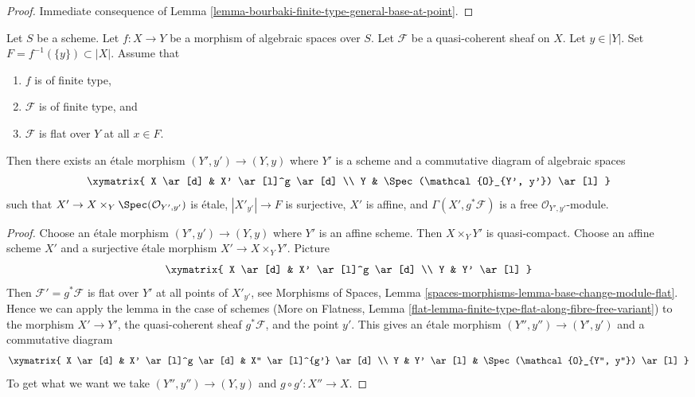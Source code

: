 \begin{proof}
Immediate consequence of
Lemma \ref{lemma-bourbaki-finite-type-general-base-at-point}.
\end{proof}

\begin{lemma}
\label{lemma-finite-type-flat-along-fibre-free-variant}
Let $S$ be a scheme. Let $f : X \to Y$ be a morphism of algebraic spaces
over $S$. Let $\mathcal{F}$ be a quasi-coherent sheaf on $X$.
Let $y \in |Y|$. Set $F = f^{-1}(\{y\}) \subset |X|$. Assume that
\begin{enumerate}
\item $f$ is of finite type,
\item $\mathcal{F}$ is of finite type, and
\item $\mathcal{F}$ is flat over $Y$ at all $x \in F$.
\end{enumerate}
Then there exists an \'etale morphism $(Y', y') \to (Y, y)$
where $Y'$ is a scheme and a commutative diagram of algebraic spaces
$$
\xymatrix{
X \ar[d] & X' \ar[l]^g \ar[d] \\
Y & \Spec(\mathcal{O}_{Y', y'}) \ar[l]
}
$$
such that $X' \to X \times_Y \Spec(\mathcal{O}_{Y', y'})$
is \'etale, $|X'_{y'}| \to F$ is surjective, $X'$ is affine,
and $\Gamma(X', g^*\mathcal{F})$ is a free $\mathcal{O}_{Y', y'}$-module.
\end{lemma}

\begin{proof}
Choose an \'etale morphism $(Y', y') \to (Y, y)$ where $Y'$ is an
affine scheme. Then $X \times_Y Y'$ is quasi-compact.
Choose an affine scheme $X'$ and a surjective \'etale morphism
$X' \to X \times_Y Y'$. Picture
$$
\xymatrix{
X \ar[d] & X' \ar[l]^g \ar[d] \\
Y & Y' \ar[l]
}
$$
Then $\mathcal{F}' = g^*\mathcal{F}$ is flat over $Y'$ at all
points of $X'_{y'}$, see Morphisms of Spaces, Lemma
\ref{spaces-morphisms-lemma-base-change-module-flat}.
Hence we can apply the lemma in the case of schemes
(More on Flatness, Lemma
\ref{flat-lemma-finite-type-flat-along-fibre-free-variant})
to the morphism
$X' \to Y'$, the quasi-coherent sheaf $g^*\mathcal{F}$, and the point $y'$.
This gives an \'etale morphism $(Y'', y'') \to (Y', y')$ and a commutative
diagram
$$
\xymatrix{
X \ar[d] & X' \ar[l]^g \ar[d] & X'' \ar[l]^{g'} \ar[d] \\
Y & Y' \ar[l] & \Spec(\mathcal{O}_{Y'', y''}) \ar[l]
}
$$
To get what we want we take $(Y'', y'') \to (Y, y)$
and $g \circ g' : X'' \to X$.
\end{proof}





